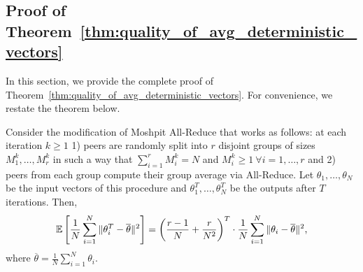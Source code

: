 \subsection{Proof of Theorem~\ref{thm:quality_of_avg_deterministic_vectors}}\label{sec:proof_quality_of_avg_deterministic_vectors}
In this section, we provide the complete proof of Theorem~\ref{thm:quality_of_avg_deterministic_vectors}. For convenience, we restate the theorem below.
\begin{theorem}\label{thm:quality_of_avg_deterministic_vectors_supp}
    Consider the modification of Moshpit All-Reduce that works as follows: at each iteration $k\geq 1$ 1) peers are randomly split into $r$ disjoint groups of sizes $M_1^k,\ldots, M_r^k$ in such a way that $\sum_{i=1}^r M_i^k = N$ and $M_i^k \ge 1\  \forall i = 1,\ldots,r$ and 2) peers from each group compute their group average via All-Reduce. Let $\theta_1,\ldots,\theta_N$ be the input vectors of this procedure and $\theta_1^T,\ldots,\theta_N^T$ be the outputs after $T$ iterations. Then,
    \begin{eqnarray}
         \mathbb{E}\left[\frac{1}{N}\sum\limits_{i=1}^N\|\theta_i^T - \overline{\theta}\|^2\right] = \left(\frac{r-1}{N} + \frac{r}{N^2}\right)^T\cdot\frac{1}{N}\sum\limits_{i=1}^N\|\theta_i - \overline{\theta}\|^2, \label{eq:determ_quality_of_avg_supp}
    \end{eqnarray}
    where $\overline{\theta} = \frac{1}{N}\sum_{i=1}^N\theta_i$.
\end{theorem}
